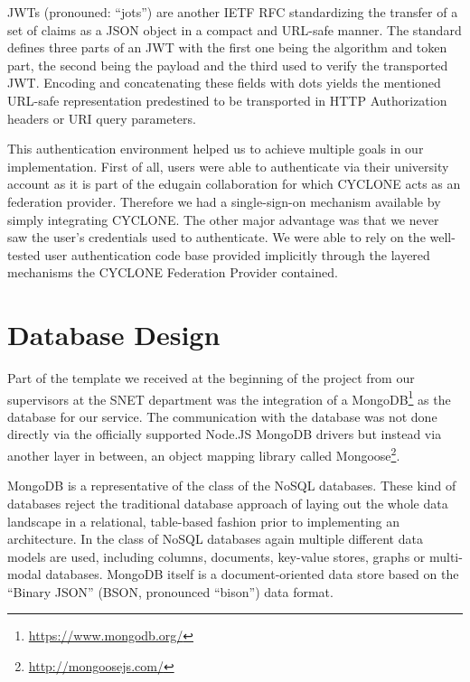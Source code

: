 JWTs (pronouned: \enquote{jots}) are another IETF RFC \cite{bradley2015json} standardizing the transfer of a set of claims as a JSON object in a compact and URL-safe manner. The standard defines three parts of an JWT with the first one being the algorithm and token part, the second being the payload and the third used to verify the transported JWT. Encoding and concatenating these fields with dots yields the mentioned URL-safe representation predestined to be transported in HTTP Authorization headers or URI query parameters.

This authentication environment helped us to achieve multiple goals in our implementation. First of all, users were able to authenticate via their university account as it is part of the edugain collaboration for which CYCLONE acts as an federation provider. Therefore we had a single-sign-on mechanism available by simply integrating CYCLONE. The other major advantage was that we never saw the user's credentials used to authenticate. We were able to rely on the well-tested user authentication code base provided implicitly through the layered mechanisms the CYCLONE Federation Provider contained.


\vspace{0.5cm}

\section{Database Design}

Part of the template we received at the beginning of the project from our supervisors at the SNET department was the integration of a MongoDB\footnote{\url{https://www.mongodb.org/}} as the database for our service. The communication with the database was not done directly via the officially supported Node.JS MongoDB drivers but instead via another layer in between, an object mapping library called Mongoose\footnote{\url{http://mongoosejs.com/}}.

MongoDB is a representative of the class of the NoSQL databases. These kind of databases reject the traditional database approach of laying out the whole data landscape in a relational, table-based fashion prior to implementing an architecture. In the class of NoSQL databases again multiple different data models are used, including columns, documents, key-value stores, graphs or multi-modal databases. MongoDB itself is a document-oriented data store based on the \enquote{Binary JSON} (BSON, pronounced \enquote{bison}) data format.


